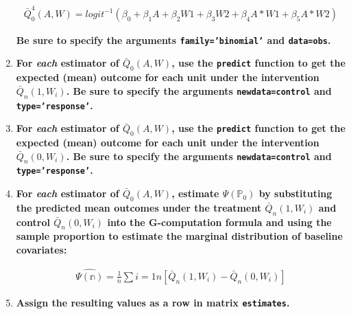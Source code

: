 \documentclass{article}\usepackage[]{graphicx}\usepackage[]{xcolor}
\begin{document}
\begin{enumerate}[label=\textbf{\alph*.}]
\begin{align*}
\bar{Q}^4_0(A,W)=logit^{-1}(\beta_0+\beta_1A+\beta_2W1+\beta_3W2+\beta_4A*W1+\beta_5A*W2)
\end{align*}

\textbf{Be sure to specify the arguments \texttt{family='binomial'} and \texttt{data=obs}.}
    
    \item \textbf{For \textit{each} estimator of $\bar{Q}_0(A,W)$, use the \texttt{predict} function to get the expected (mean) outcome for each unit under the intervention $\bar{Q}_n(1,W_i)$. Be sure to specify the arguments \texttt{newdata=control} and \texttt{type='response'}.}
    
    \item \textbf{For \textit{each} estimator of $\bar{Q}_0(A,W)$, use the \texttt{predict} function to get the expected (mean) outcome for each unit under the intervention $\bar{Q}_n(0,W_i)$. Be sure to specify the arguments \texttt{newdata=control} and \texttt{type='response'}.}
    
    \item \textbf{For \textit{each} estimator of $\bar{Q}_0(A,W)$, estimate $\Psi(\mathbb{P}_0)$ by substituting the predicted mean outcomes under the treatment $\bar{Q}_n(1,W_i)$ and control $\bar{Q}_n(0,W_i)$ into the G-computation formula and using the sample proportion to estimate the marginal distribution of baseline covariates:}
    
\begin{align*}
\hat{\Psi(\mathbb{n})}=\frac{1}{n}\sum{i=1}{n}[\bar{Q}_n(1,W_i)-\bar{Q}_n(0,W_i)]
\end{align*}
    
    \item \textbf{Assign the resulting values as a row in matrix \texttt{estimates}.}
    
  \end{enumerate}
  
\end{document}
